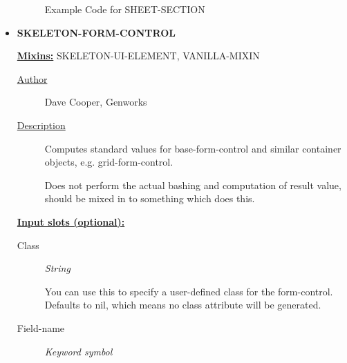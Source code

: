 \documentclass [11pt]{book}
\begin{document}
\begin{itemize}
\begin{figure}
\begin{lrbox}{\boxedverb}
\begin{minipage}{\linewidth}
{\begin{verbatim}
\end{verbatim}}
\end{minipage}
\end{lrbox}
\fbox{\usebox{\boxedverb}}

\caption{Example Code for SHEET-SECTION}

\label{fig:example-code-SHEET-SECTION}

\end{figure}






\item {}
\label{prim:skeleton-form-control}
\textbf{SKELETON-FORM-CONTROL}


\textbf{
\underline{Mixins:}} SKELETON-UI-ELEMENT, VANILLA-MIXIN





\begin{description}

\item [
\underline{Author}]


Dave Cooper, Genworks



\item [
\underline{Description}]


Computes standard values for base-form-control and similar container objects, e.g. grid-form-control.

Does not perform the actual bashing and computation of result value, should be mixed in to something which does this.



\end{description}








\textbf{
\underline{Input slots (optional):}}

\begin{description}

\item [Class]
\emph{String}

 You can use this to specify a user-defined class for the form-control. Defaults to nil, which means no class attribute will be generated.




\item [Field-name]
\emph{Keyword symbol}


\end{description}
\end{itemize}
\end{document}
